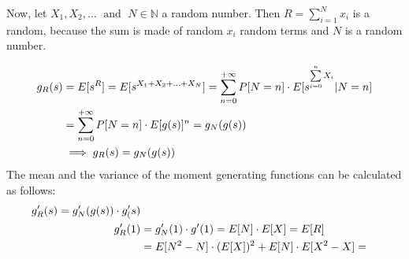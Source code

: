 Now, let $X_1, X_2, \dotsc \; \text{ and }\; N \in \mathbb{N}$ a random number. Then $R=\sum\limits_{i=1}^{N}x_i$
is a random, because the sum is made of random $x_i$ random terms and $N$ is a random number.

\begin{equation}$$
  \begin{split}
    g_R(s)&=E[s^R]=E[s^{X_1+X_2+\dotsc+X_N}]=\sum\limits_{n=0}^{+\infty} P[N=n]\cdot E[s^{\sum\limits_{i=0}^{n}X_i}|N=n]\\
    &=\sum\limits_{n=0}^{+\infty} P[N=n]\cdot E[g(s)]^n=g_N(g(s))
    \\ & \implies g_R(s) = g_N(g(s))
  \end{split}$$
\end{equation}
The mean and the variance of the moment generating functions can be calculated as follows:
\begin{equation}
$$
\begin{split}
  g'_R(s) = g'_N(g(s)) \cdot g'_(s) \\
  g'_R(1) &= g_N'(1)\cdot g'(1) = E[N]\cdot E[X]=E[R]\\
  &=E[N^2-N]\cdot (E[X])^2 + E[N]\cdot E[X^2-X] = 
\end{split}
$$
\end{equation}
